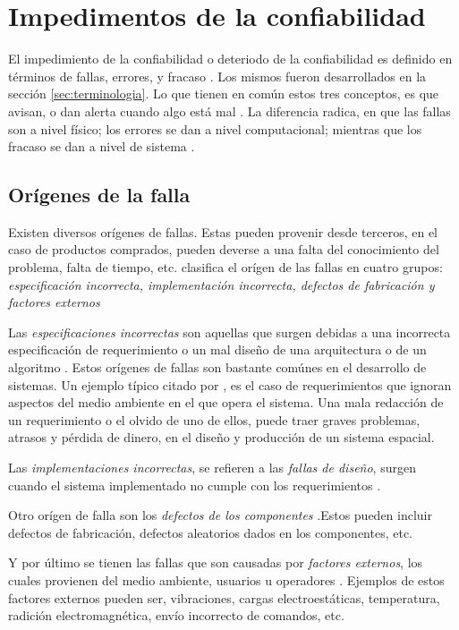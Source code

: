 \section{Impedimentos de la confiabilidad}
El impedimiento de la confiabilidad o deteriodo de la confiabilidad es definido en términos de
fallas, errores, y fracaso \citep{FTDesign}. Los mismos fueron desarrollados en la sección
\ref{sec:terminologia}. Lo que tienen en común estos tres conceptos, es que avisan, o dan alerta
cuando algo está mal \citep{FTDesign}. La diferencia radica, en que las fallas son a nivel físico;
los errores se dan a nivel computacional; mientras que los fracaso se dan a nivel de sistema
\cite{FTDesign}.

\subsection{Orígenes de la falla}
Existen diversos orígenes de fallas. Estas pueden provenir desde terceros, en el caso de productos
comprados, pueden deverse a una falta del conocimiento del problema, falta de tiempo, etc.
\cite{FTDesign} clasifica el orígen de las fallas en cuatro grupos: \textit{especificación
incorrecta, implementación incorrecta, defectos de fabricación y factores externos}

Las \textit{especificaciones incorrectas} son aquellas que surgen debidas a una incorrecta
especificación de requerimiento o un mal diseño de una arquitectura o de un algoritmo
\citep{FTDesign}. Estos orígenes de fallas son bastante comúnes en el desarrollo de sistemas. Un
ejemplo típico citado por \cite{FTDesign}, es el caso de requerimientos que ignoran aspectos del
medio ambiente en el que opera el sistema. Una mala redacción de un requerimiento o el olvido de
uno de ellos, puede traer graves problemas, atrasos y pérdida de dinero,  en el diseño y producción
de un sistema espacial.

Las \textit{implementaciones incorrectas}, se refieren a las \textit{fallas de diseño}, surgen
cuando el sistema implementado no cumple con los requerimientos \citep{FTDesign}.

Otro orígen de falla son los \textit{defectos de los componentes} \citep{FTDesign}.Estos pueden
incluir defectos de fabricación, defectos aleatorios dados en los componentes, etc.

Y por último se tienen las fallas que son causadas por \textit{factores externos}, los cuales
provienen del medio ambiente, usuarios u operadores \citep{FTDesign}. Ejemplos de estos factores
externos pueden ser, vibraciones, cargas electroestáticas, temperatura, radición electromagnética,
envío incorrecto de comandos, etc.

